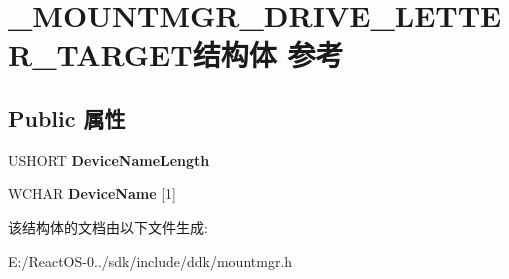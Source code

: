 \hypertarget{struct___m_o_u_n_t_m_g_r___d_r_i_v_e___l_e_t_t_e_r___t_a_r_g_e_t}{}\section{\+\_\+\+M\+O\+U\+N\+T\+M\+G\+R\+\_\+\+D\+R\+I\+V\+E\+\_\+\+L\+E\+T\+T\+E\+R\+\_\+\+T\+A\+R\+G\+E\+T结构体 参考}
\label{struct___m_o_u_n_t_m_g_r___d_r_i_v_e___l_e_t_t_e_r___t_a_r_g_e_t}
\subsection*{Public 属性}
\begin{DoxyCompactItemize}
\item 
\mbox{\label{struct___m_o_u_n_t_m_g_r___d_r_i_v_e___l_e_t_t_e_r___t_a_r_g_e_t_ac470242c372f79036028555df425ef18}} 
U\+S\+H\+O\+RT {\bfseries Device\+Name\+Length}
\item 
\mbox{\label{struct___m_o_u_n_t_m_g_r___d_r_i_v_e___l_e_t_t_e_r___t_a_r_g_e_t_abd56cfd9531ba3fffe1f19fda132be04}} 
W\+C\+H\+AR {\bfseries Device\+Name} \mbox{[}1\mbox{]}
\end{DoxyCompactItemize}


该结构体的文档由以下文件生成\+:\begin{DoxyCompactItemize}
\item 
E\+:/\+React\+O\+S-\/0../sdk/include/ddk/mountmgr.\+h\end{DoxyCompactItemize}
